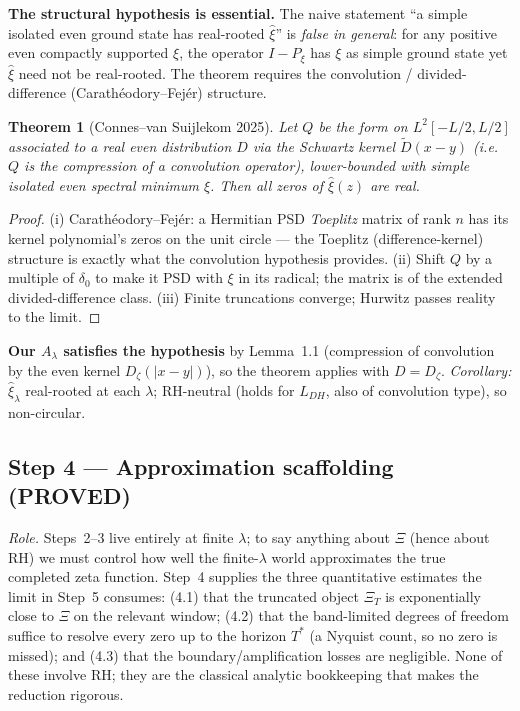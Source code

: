 \documentclass[11pt]{amsart}
\newtheorem{theorem}{Theorem}[section]
\theoremstyle{definition}
\theoremstyle{remark}
\newcommand{\PROVED}{\textbf{(PROVED)}}
\begin{document}
\textbf{The structural hypothesis is essential.} The naive statement ``a simple isolated even
ground state has real-rooted $\hat\xi$'' is \emph{false in general}: for any positive even
compactly supported $\xi$, the operator $I-P_\xi$ has $\xi$ as simple ground state yet $\hat\xi$
need not be real-rooted. The theorem requires the convolution / divided-difference
(Carath\'eodory--Fej\'er) structure.
\begin{theorem}[Connes--van Suijlekom 2025]
Let $Q$ be the form on $L^2[-L/2,L/2]$ associated to a real even distribution $D$ via the
Schwartz kernel $\widetilde D(x-y)$ (i.e.\ $Q$ is the compression of a convolution operator),
lower-bounded with simple isolated even spectral minimum $\xi$. Then all zeros of $\hat\xi(z)$
are real.
\end{theorem}
\begin{proof}
(i) Carath\'eodory--Fej\'er: a Hermitian PSD \emph{Toeplitz} matrix of rank $n$ has its kernel
polynomial's zeros on the unit circle --- the Toeplitz (difference-kernel) structure is exactly
what the convolution hypothesis provides. (ii) Shift $Q$ by a multiple of $\delta_0$ to make it
PSD with $\xi$ in its radical; the matrix is of the extended divided-difference class. (iii)
Finite truncations converge; Hurwitz passes reality to the limit.
\end{proof}
\noindent\textbf{Our $A_\lambda$ satisfies the hypothesis} by Lemma~1.1 (compression of
convolution by the even kernel $D_\zeta(|x-y|)$), so the theorem applies with $D=D_\zeta$.
\emph{Corollary:} $\hat\xi_\lambda$ real-rooted at each $\lambda$; RH-neutral (holds for $L_{DH}$,
also of convolution type), so non-circular.

\subsection{Step 4 --- Approximation scaffolding \PROVED}

\emph{Role.} Steps~2--3 live entirely at finite $\lambda$; to say anything about $\Xi$ (hence
about RH) we must control how well the finite-$\lambda$ world approximates the true completed
zeta function. Step~4 supplies the three quantitative estimates the limit in Step~5 consumes:
(4.1) that the truncated object $\Xi_T$ is exponentially close to $\Xi$ on the relevant window;
(4.2) that the band-limited degrees of freedom suffice to resolve every zero up to the horizon
$T^*$ (a Nyquist count, so no zero is missed); and (4.3) that the boundary/amplification losses
are negligible. None of these involve RH; they are the classical analytic bookkeeping that makes
the reduction rigorous.
\end{document}
